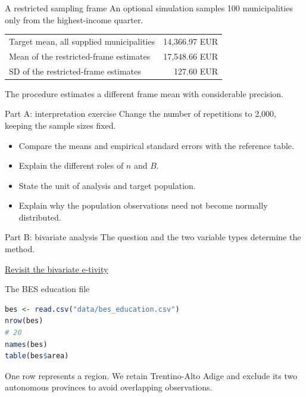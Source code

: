 \begin{frame}{A restricted sampling frame}
An optional simulation samples 100 municipalities only from the highest-income quarter.
\begin{center}\begin{tabular}{lr}\toprule
Target mean, all supplied municipalities & 14,366.97 EUR\\[2mm]
Mean of the restricted-frame estimates & 17,548.66 EUR\\[2mm]
SD of the restricted-frame estimates & 127.60 EUR\\\bottomrule\end{tabular}\end{center}
The procedure estimates a different frame mean with considerable precision.
\end{frame}

\begin{frame}{Part A: interpretation exercise}
Change the number of repetitions to 2,000, keeping the sample sizes fixed.
\begin{itemize}
\item Compare the means and empirical standard errors with the reference table.
\item Explain the different roles of $n$ and $B$.
\item State the unit of analysis and target population.
\item Explain why the population observations need not become normally distributed.
\end{itemize}

\end{frame}

\begin{frame}{Part B: bivariate analysis}
\Large The question and the two variable types determine the method.\par\vspace{6mm}\normalsize\href{https://silviasaliniunimi.github.io/data-analysis-tax-compliance/04-bivariate.html}{Revisit the bivariate e-tivity}
\end{frame}

\begin{frame}[fragile]{The BES education file}
\begin{lstlisting}[language=R]
bes <- read.csv("data/bes_education.csv")
nrow(bes)
# 20
names(bes)
table(bes$area)
\end{lstlisting}
One row represents a region. We retain Trentino-Alto Adige and exclude its two autonomous provinces to avoid overlapping observations.
\end{frame}


